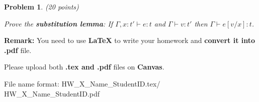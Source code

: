 \documentclass[12pt]{article}
\newtheorem{hw}{Problem}
\begin{document}
\begin{hw}\rm (20 points)
	
	Prove the \textbf{substitution lemma}: If $\Gamma,x:t' \vdash e:t$ and $\Gamma \vdash v:t'$ then $\Gamma \vdash e[v/x]:t$.
\end{hw}


\vspace{20pt}

\textbf{Remark:} 
You need to use \textbf{LaTeX} to write your homework and \textbf{convert it into .pdf} file.

Please upload both \textbf{.tex and .pdf} files on \textbf{Canvas}.

File name format: {\color{red} HW\_X\_Name\_StudentID.tex/\color{red} HW\_X\_Name\_StudentID.pdf}
\end{document}
